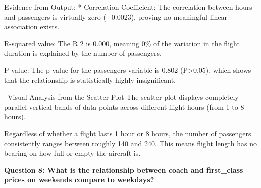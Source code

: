 \documentclass[11pt,a4paper]{article}
\begin{document}
Evidence from Output: * Correlation Coefficient: The correlation between hours and passengers is virtually zero (−0.0023), proving no meaningful linear association exists.

R-squared value: The R 
2
  is 0.000, meaning 0\% of the variation in the flight duration is explained by the number of passengers.

P-value: The p-value for the passengers variable is 0.802 (P>0.05), which shows that the relationship is statistically highly insignificant.

~Visual Analysis from the Scatter Plot
The scatter plot displays completely parallel vertical bands of data points across different flight hours (from 1 to 8 hours).

Regardless of whether a flight lasts 1 hour or 8 hours, the number of passengers consistently ranges between roughly 140 and 240. This means flight length has no bearing on how full or empty the aircraft is.
\vspace{2.5em}

\noindent \textbf{\large Question 8:
What is the relationship between coach and first\_class prices on weekends compare to weekdays?}
\end{document}
